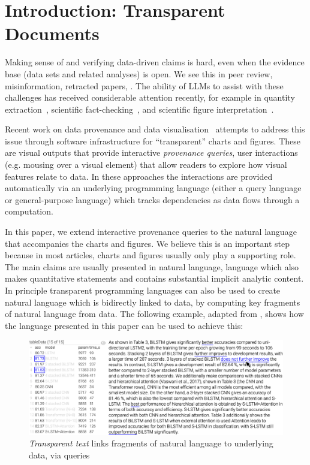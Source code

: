 \section{Introduction: Transparent Documents}

Making sense of and verifying data-driven claims is hard, even when the evidence base (data sets and related
analyses) is open. We see this in peer review, misinformation, retracted papers, . The ability of LLMs to assist with these challenges has received considerable attention recently,
for example in quantity extraction~\citep{bolucu23}, scientific fact-checking~\citep{abu-ahmad25}, and
scientific figure interpretation~\citep{roberts24}.

Recent work on data provenance and data visualisation~\citep{psallidas18smoke,perera22,bond25} attempts to
address this issue through software infrastructure for ``transparent'' charts and figures. These are visual
outputs that provide interactive \emph{provenance queries}, user interactions (e.g. mousing over a visual
element) that allow readers to explore how visual features relate to data. In these approaches the
interactions are provided automatically via an underlying programming language (either a query language or
general-purpose language) which tracks dependencies as data flows through a computation.

In this paper, we extend interactive provenance queries to the natural language that accompanies the charts
and figures. We believe this is an important step because in most articles, charts and figures usually only
play a supporting role. The main claims are usually presented in natural language, language which also makes
quantitative statements and contains substantial implicit analytic content. In principle transparent
programming languages can also be used to create natural language which is bidirectly linked to data, by
computing key fragments of natural language from data. The following example, adapted from \cite{moosavi21},
shows how the language presented in this paper can be used to achieve this:

\begin{figure}%
    \centering
    \includegraphics[width=\linewidth]{fig/scigen-1805.02474v1-10-with-pointer.png}
    \caption{\emph{Transparent text} links fragments of natural language to underlying data, via queries}\label{fig:scigen-example-website}
\end{figure}

